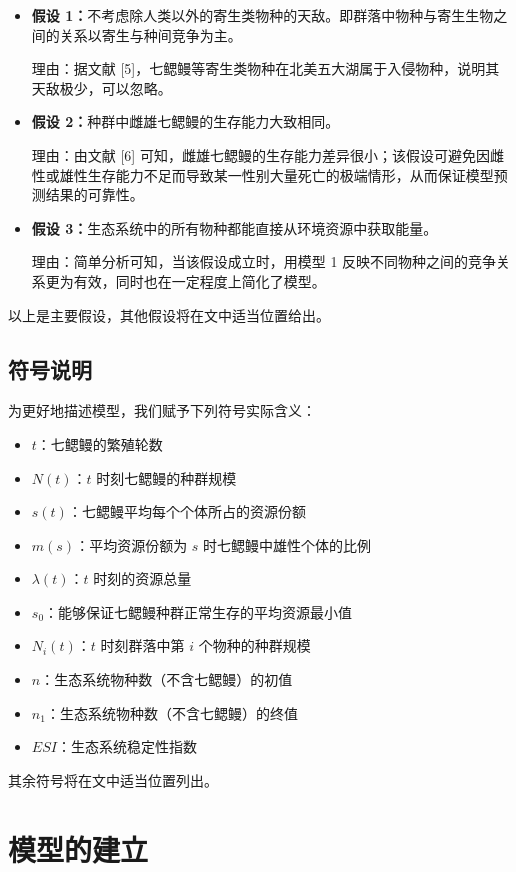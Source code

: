 \documentclass[11pt,a4paper]{ctexart}
\begin{document}
\begin{itemize}
\item \textbf{假设 1：}不考虑除人类以外的寄生类物种的天敌。即群落中物种与寄生生物之间的关系以寄生与种间竞争为主。

理由：据文献 [5]，七鳃鳗等寄生类物种在北美五大湖属于入侵物种，说明其天敌极少，可以忽略。

\item \textbf{假设 2：}种群中雌雄七鳃鳗的生存能力大致相同。

理由：由文献 [6] 可知，雌雄七鳃鳗的生存能力差异很小；该假设可避免因雌性或雄性生存能力不足而导致某一性别大量死亡的极端情形，从而保证模型预测结果的可靠性。

\item \textbf{假设 3：}生态系统中的所有物种都能直接从环境资源中获取能量。

理由：简单分析可知，当该假设成立时，用模型 1 反映不同物种之间的竞争关系更为有效，同时也在一定程度上简化了模型。
\end{itemize}

以上是主要假设，其他假设将在文中适当位置给出。

\subsection{符号说明}

为更好地描述模型，我们赋予下列符号实际含义：

\begin{itemize}
\item $t$：七鳃鳗的繁殖轮数
\item $N(t)$：$t$ 时刻七鳃鳗的种群规模
\item $s(t)$：七鳃鳗平均每个个体所占的资源份额
\item $m(s)$：平均资源份额为 $s$ 时七鳃鳗中雄性个体的比例
\item $\lambda(t)$：$t$ 时刻的资源总量
\item $s_0$：能够保证七鳃鳗种群正常生存的平均资源最小值
\item $N_i(t)$：$t$ 时刻群落中第 $i$ 个物种的种群规模
\item $n$：生态系统物种数（不含七鳃鳗）的初值
\item $n_1$：生态系统物种数（不含七鳃鳗）的终值
\item $ESI$：生态系统稳定性指数
\end{itemize}

其余符号将在文中适当位置列出。
\section{模型的建立}
\end{document}
